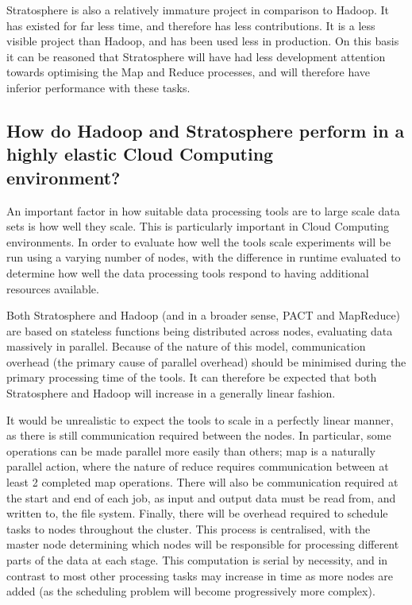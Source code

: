 Stratosphere is also a relatively immature project in comparison to Hadoop. It has existed for far less time, and therefore has less contributions. It is a less visible project than Hadoop, and has been used less in production. On this basis it can be reasoned that Stratosphere will have had less development attention towards optimising the Map and Reduce processes, and will therefore have inferior performance with these tasks.

\tocless\subsection{How do Hadoop and Stratosphere perform in a highly elastic Cloud Computing \\ environment?}
An important factor in how suitable data processing tools are to large scale data sets is how well they scale. This is particularly important in Cloud Computing environments. In order to evaluate how well the tools scale experiments will be run using a varying number of nodes, with the difference in runtime evaluated to determine how well the data processing tools respond to having additional resources available. 

Both Stratosphere and Hadoop (and in a broader sense, PACT and MapReduce) are based on stateless functions being distributed across nodes, evaluating data massively in parallel. Because of the nature of this model, communication overhead (the primary cause of parallel overhead) should be minimised during the primary processing time of the tools. It can therefore be expected that both Stratosphere and Hadoop will increase in a generally linear fashion.

It would be unrealistic to expect the tools to scale in a perfectly linear manner, as there is still communication required between the nodes. In particular, some operations can be made parallel more easily than others; map is a naturally parallel action, where the nature of reduce requires communication between at least 2 completed map operations. There will also be communication required at the start and end of each job, as input and output data must be read from, and written to, the file system. Finally, there will be overhead required to schedule tasks to nodes throughout the cluster. This process is centralised, with the master node determining which nodes will be responsible for processing different parts of the data at each stage. This computation is serial by necessity, and in contrast to most other processing tasks may increase in time as more nodes are added (as the scheduling problem will become progressively more complex). 

